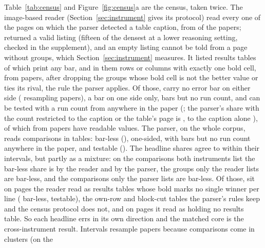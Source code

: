 \documentclass[sigconf,anonymous]{aamas}
\begin{document}
Table~\ref{tab:census} and Figure~\ref{fig:census}a are the census, taken
twice. The image-based reader (Section~\ref{sec:instrument} gives its
protocol) read every one of the \nCzPagesDrawn{} pages on which the parser
detected a table caption, from \nCzPapersDrawn{} of the \nAPapers{}
papers; \nCzPagesRead{} returned a valid listing (fifteen of the densest
at a lower reasoning setting, checked in the supplement), and an empty
listing cannot be told from a page without groups, which
Section~\ref{sec:instrument} measures. It listed \nCzTables{} results
tables of which \nCzTablesWithBar{} print any bar, and in them
\nCzGroups{} rows or columns with exactly one bold cell, from
\nCzPapersWithGroups{} papers, after dropping the groups whose bold cell
is not the better value or ties its rival, the rule the parser applies.
Of those, \nCzNeither{} carry no error bar
on either side (\nCzNeitherCi{} resampling papers), \nCzOneSide{} a bar on
one side only, \nCzBarsNoN{} bars but no run count, and \nCzTestable{} can
be tested with a run count from anywhere in the paper (\nCzTestableCi{};
the parser's share with the count restricted to the caption or the
table's page is \nSpanCaptionOrPageTestable{}, to the caption alone
\nStrictTestable{}), of which \nCzReaderFailN{} from
\nCzReaderFailPapers{} papers have readable values. The
parser, on the whole corpus, reads \nAComparisons{} comparisons in
\nATablesYielding{} tables: \nAPctNeither{} bar-less (\nAPctNeitherCi{}),
\nAPctOneSide{} one-sided, \nAPctNoN{} with bars but no run count anywhere
in the paper, and \nAPctTestable{} testable (\nAPctTestableCi{}). The
headline shares agree to within their intervals, but partly as a mixture:
on the \nCzPipeMatchedGroups{} comparisons both instruments list the
bar-less share is \nCzMatchedNeither{} by the reader and
\nCzPipeMatchedNeither{} by the parser, the \nCzReaderUnmatchedGroups{}
groups only the reader lists are \nCzUnmatchedNeither{} bar-less, and the
\nCzPipeUnconfirmedN{} comparisons only the parser lists are
\nCzPipeUnconfirmedNeither{} bar-less. Of those, \nEcNoneComparisons{} sit
on \nEcNonePages{} pages the reader read as results tables whose bold
marks no single winner per line (\nEcNoneNeither{} bar-less,
\nEcNoneTestable{} testable), the own-row and block-cut tables the
parser's rules keep and the census protocol does not, and
\nEcNotableComparisons{} on \nEcNotablePages{} pages it read as holding
no results table. So each headline errs in its own direction and the
matched core is the cross-instrument result.
Intervals resample papers because comparisons come in clusters (on the
\end{document}
